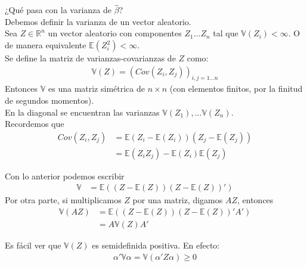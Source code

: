 \documentclass[10pt]{article}
\theoremstyle{plain}
\theoremstyle{definition}
\begin{document}
¿Qué pasa con la varianza de $\hat{\beta}$?\\

Debemos definir la varianza de un vector aleatorio.\\

Sea $Z \in \mathbb{R}^n$ un vector aleatorio con componentes $Z_{1}\ldots Z_{n}$ tal que $\mathbb{V}(Z_{i}) < \infty$. O de manera equivalente $\mathbb{E}(Z_{i}^2) < \infty$.\\

Se define la matriz de varianzas-covarianzas de $Z$ como:
\begin{align*}
\mathbb{V}(Z) = (Cov(Z_{i},Z_{j}))_{i,j = 1\ldots n}
\end{align*}
Entonces $\mathbb{V}$ es una matriz simétrica de $n\times n $ (con elementos finitos, por la finitud de segundos momentos).\\
En la diagonal se encuentran las varianzas $\mathbb{V}(Z_{1}), \ldots \mathbb{V}(Z_{n})$.\\

Recordemos que 
\begin{align*}
Cov(Z_{i}, Z_{j}) &= \mathbb{E}(Z_{i}-\mathbb{E} (Z_{i})) (Z_{j}-\mathbb{E} (Z_{j})) \\
&= \mathbb{E}(Z_{i}Z_{j})- \mathbb{E}(Z_{i})\mathbb{E}(Z_{j})
\end{align*}

Con lo anterior podemos escribir
\begin{align*}
\mathbb{V} &= \mathbb{E}((Z-\mathbb{E}(Z))(Z-\mathbb{E}(Z))')
\end{align*}
Por otra parte, si multiplicamos $Z$ por una matriz, digamos $AZ$, entonces
\begin{align*}
\mathbb{V}(AZ) &= \mathbb{E}((Z-\mathbb{E}(Z))(Z-\mathbb{E}(Z))'A')\\
&= A \mathbb{V}(Z)A'
\end{align*}

Es fácil ver que $\mathbb{V}(Z)$ es semidefinida positiva. En efecto:
\begin{align*}
\alpha'\mathbb{V}\alpha = \mathbb{V}(\alpha'Z\alpha) \ge 0
\end{align*}
\end{document}
